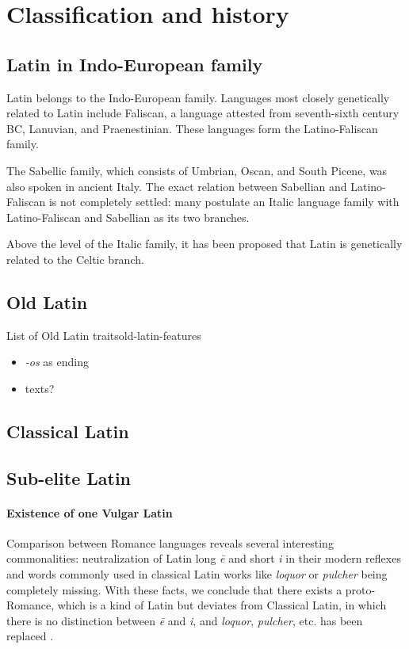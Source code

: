 \documentclass[a4paper, oneside, 12pt]{report}
\newcommand*{\citepages}[1]{pp.~{#1}}
\newcommand{\form}[1]{\emph{#1}}
\begin{document}
\section{Classification and history}

\subsection{Latin in Indo-European family}

Latin belongs to the Indo-European family.
Languages most closely genetically related to Latin include Faliscan,
a language attested from seventh-sixth century BC,
Lanuvian, and Praenestinian.
These languages form the Latino-Faliscan family.

The Sabellic family, which consists of Umbrian, Oscan, and South Picene,
was also spoken in ancient Italy.
The exact relation between Sabellian and Latino-Faliscan is not completely settled:
many postulate an Italic language family
with Latino-Faliscan and Sabellian as its two branches.

Above the level of the Italic family,
it has been proposed that Latin is genetically related to the Celtic branch. 

\subsection{Old Latin}

\begin{todobox}{List of Old Latin traits}{old-latin-features}
    \begin{itemize}
        \item \form{-os} as ending
        \item texts?
    \end{itemize}
\end{todobox}

\subsection{Classical Latin}

\subsection{Sub-elite Latin}\label{sec:introduction.history.sub-elite}

\paragraph*{Existence of one Vulgar Latin}
Comparison between Romance languages reveals several interesting commonalities:
neutralization of Latin long \form{\={e}} and short \form{i}
in their modern reflexes
and words commonly used in classical Latin works like \form{loquor} or \form{pulcher}
being completely missing.
With these facts, we conclude that there exists a proto-Romance,
which is a kind of Latin but deviates from Classical Latin,
in which there is no distinction between \form{\={e}} and \form{i}, 
and \form{loquor}, \form{pulcher}, etc. has been replaced
\citep[\citepages{1-3}]{herman2010vulgar}.
\end{document}
